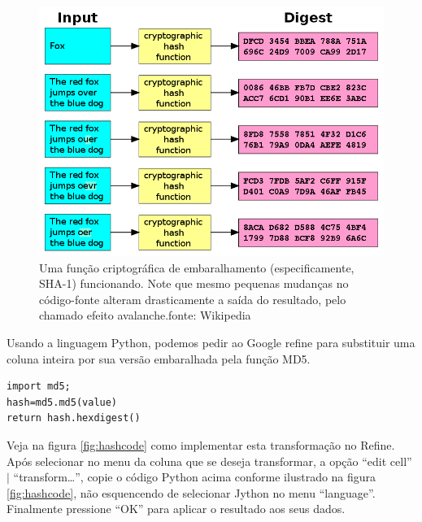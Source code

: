 \documentclass[a4paper,10pt]{report}
\begin{document}
\begin{figure}[h!]
 \includegraphics[width=12cm]{./740px-Cryptographic_Hash_Function.png}
 \caption{Uma função criptográfica de embaralhamento (especificamente, SHA-1) funcionando. Note que mesmo pequenas mudanças no código-fonte alteram drasticamente a saída do resultado, pelo chamado efeito avalanche.fonte: Wikipedia}
 \label{fig:hash}
\end{figure}

Usando a linguagem Python, podemos pedir ao Google refine para substituir uma coluna inteira por sua versão embaralhada pela função MD5.


\begin{lstlisting}
import md5;
hash=md5.md5(value)
return hash.hexdigest()
\end{lstlisting}

Veja na figura \ref{fig:hashcode} como implementar esta transformação no Refine. Após selecionar no menu da coluna que se deseja transformar, a opção ``edit cell'' $\mid$ ``transform\ldots'', copie o código Python acima conforme ilustrado na figura \ref{fig:hashcode}, não esquencendo de selecionar Jython no menu ``language''. Finalmente pressione ``OK'' para aplicar o resultado aos seus dados.
\end{document}

